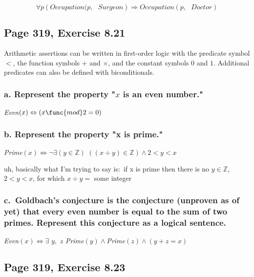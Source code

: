 \documentclass{article}
\begin{document}
\[
\forall p\left( Occupation(p,\text{ }Surgeon\right) \Rightarrow Occupation(p,%
\text{ }Doctor) 
\]

\subsection{Page 319, Exercise 8.21}

Arithmetic assertions can be written in first-order logic with the predicate
symbol $<$, the function symbols $+$ and $\times $, and the constant symbols 
$0$ and $1$. Additional predicates can also be defined with biconditionals.

\subsubsection{a. Represent the property "$x$ is an even number."}

\textit{Even}$\left( x\right) \Leftrightarrow \left( x\func{mod}2=0\right) $

\subsubsection{b. Represent the property "x is prime."}

\textit{Prime}$\left( x\right) \Leftrightarrow \lnot \exists \left( y\in 
\mathbb{Z}
\right) $ $\left( \left( x\div y\right) \in 
\mathbb{Z}
\right) \wedge 2<y<x$

uh, basically what I'm trying to say is:\ if x is prime then there is no $%
y\in 
\mathbb{Z}
$, $2<y<x$, for which $x\div y=$ some integer

\subsubsection{c.\ Goldbach's conjecture is the conjecture (unproven as of
yet) that every even number is equal to the sum of two primes. Represent
this conjecture as a logical sentence.}

\textit{Even}$\left( x\right) \Leftrightarrow \exists $ $y,$ $z$ \textit{%
Prime}$\left( y\right) \wedge $\textit{Prime}$\left( z\right) \wedge \left(
y+z=x\right) $

\subsection{Page 319, Exercise 8.23}
\end{document}
